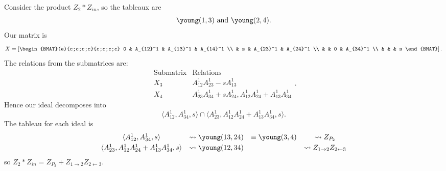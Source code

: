 \documentclass[draft]{article}
\begin{document}
\begin{example}
Consider the product $Z_2 * Z_{in}$, so the tableaux are 
\[
\young(1,3) \text{ and } \young(2,4).
\]
Our matrix is 
\[
X = \left[\begin{BMAT}(e){c;c;c;c}{c;c;c;c}
    0 & A_{12}^1 & A_{13}^1 & A_{14}^1 \\
     & s & A_{23}^1 & A_{24}^1 \\
     & & 0 & A_{34}^1 \\
     & & & s
\end{BMAT}
\right].
\]
The relations from the submatrices are:
\[
\begin{array}{c|c}
    \text{Submatrix} & \text{Relations} \\ \hline
    X_3 & A_{12}^1A_{23}^1 - sA_{13}^1 \\
    X_4 & A_{23}^1A_{34}^1 + sA_{24}^1, A_{12}^1A_{24}^1 + A_{13}^1A_{34}^1
\end{array}.
\]
Hence our ideal decomposes into 
\[
\langle A_{12}^1,A_{34}^1,s \rangle \cap \langle A_{23}^1,A_{12}^1A_{24}^1 + A_{13}^1A_{34}^1,s \rangle.
\]
The tableau for each ideal is
\[\begin{array}{cccc}\vspace{1mm}
    \langle A_{12}^1,A_{34}^1,s \rangle &\leadsto \young(13,24) &\equiv \young(3,4) &\leadsto Z_{P_2} \\ 
    \langle A_{23}^1,A_{12}^1A_{24}^1 + A_{13}^1A_{34}^1,s \rangle &\leadsto \young(12,34) & &\leadsto Z_{1 \rightarrow 2} Z_{2 \leftarrow 3}
\end{array}
\]
so $Z_2 * Z_{in} = Z_{P_2} + Z_{1 \rightarrow 2} Z_{2 \leftarrow 3}$.
\end{example}
\end{document}
